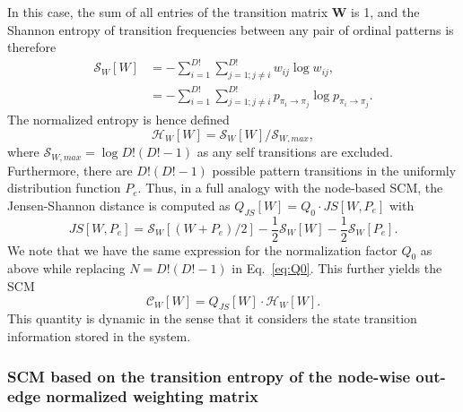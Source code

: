 \documentclass[12pt,aip,cha,reprint,nofootinbib]{revtex4-1}
\begin{document}
In this case, the sum of all entries of the transition matrix $\mathbf{W}$ is 1, and the Shannon entropy of transition frequencies between any pair of ordinal patterns is therefore 
\begin{equation}
\begin{split}
\mathcal{S}_{W}[W] &= - \sum_{i=1}^{D!} \sum_{j = 1; j \neq i}^{D!} w_{ij} \log w_{ij}, \\
& = - \sum_{i=1}^{D!} \sum_{j =1; j \neq i}^{D!} p_{\pi_i \to \pi_j} \log p_{\pi_i \to \pi_j}. 
\end{split}
\end{equation}
The normalized entropy is hence defined 
\begin{equation}
\mathcal{H}_{W}[W] = \mathcal{S}_{W}[W] / \mathcal{S}_{W, max}, 
\end{equation}
where $\mathcal{S}_{W, max} = \log D! (D! - 1)$ as any self transitions are excluded. Furthermore, there are $D! (D! - 1)$ possible pattern transitions in the uniformly distribution function $P_e$. Thus, in a full analogy with the node-based SCM, the Jensen-Shannon distance is computed as $Q_{JS}[W] = Q_0 \cdot JS[W, P_e]$ with
\begin{equation}
JS [W, P_e] = \mathcal{S}_{W}[(W + P_e)/2] - \frac{1}{2}\mathcal{S}_{W}[W] - \frac{1}{2}\mathcal{S}_{W}[P_e]. 
\end{equation}
We note that we have the same expression for the normalization factor $Q_0$ as above while replacing $N = D! (D! - 1)$ in Eq.~\eqref{eq:Q0}. This further yields the SCM 
\begin{equation}
\mathcal{C}_{W}[W] = Q_{JS}[W] \cdot \mathcal{H}_{W}[W].
\end{equation}
This quantity is dynamic in the sense that it considers the state transition information stored in the system. 

\subsubsection{SCM based on the transition entropy of the node-wise out-edge normalized weighting matrix}
\end{document}

